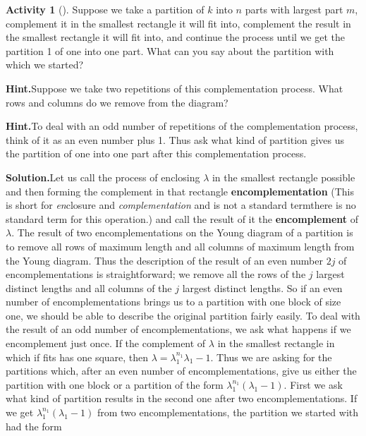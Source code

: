 \documentclass[10pt,]{book}
\newcommand{\terminology}[1]{\textbf{#1}}
\theoremstyle{plain}
\theoremstyle{definition}
\newtheorem{activity}[project]{Activity}
\numberwithin{equation}{chapter}
\begin{document}
\begin{activity}[]\label{activity-157}
Suppose we take a partition of \(k\) into \(n\) parts with largest part \(m\), complement it in the smallest rectangle it will fit into, complement the result in the smallest rectangle it will fit into, and continue the process until we get the partition 1 of one into one part.  What can you say about the partition with which we started?%
\par\medskip\noindent%
\textbf{Hint.}\quad Suppose we take two repetitions of this complementation process. What rows and columns do we remove from the diagram?%
\par\medskip\noindent%
\textbf{Hint.}\quad To deal with an odd number of repetitions of the complementation process, think of it as an even number plus 1. Thus ask what kind of partition gives us the partition of one into one part after this complementation process.%
\par\medskip\noindent%
\textbf{Solution.}\quad Let us call the process of enclosing \(\lambda\) in the smallest rectangle possible and then forming the complement in that rectangle \terminology{encomplementation} (This is short for \emph{en}\/closure and \emph{complementation} and is not a standard term\textemdash{}there is no standard term for this operation.) and call the result of it the \terminology{encomplement} of \(\lambda\).  The result of two encomplementations on the Young diagram of a partition is to remove all rows of maximum length and all columns of maximum length from the Young diagram. Thus the description of the result of an even number \(2j\) of encomplementations is straightforward; we remove all the rows of the \(j\) largest distinct lengths and all columns of the \(j\) largest distinct lengths. So if an even number of encomplementations brings us to a partition with one block of size one, we should be able to describe the original partition fairly easily. To deal with the result of an odd number of encomplementations, we ask what happens if we encomplement just once.  If the complement of \(\lambda\) in the smallest rectangle in which if fits has one square, then \(\lambda =\lambda_1^{n_1}\lambda_1-1\). Thus we are asking for the partitions which, after an even number of encomplementations, give us either the partition with one block or a partition of the form \(\lambda_1^{n_1}(\lambda_1-1)\). First we ask what kind of partition results in the second one after two encomplementations. If we get \(\lambda_1^{n_1}(\lambda_1-1)\) from two encomplementations, the partition we started with had the form%

\end{activity}
\end{document}
